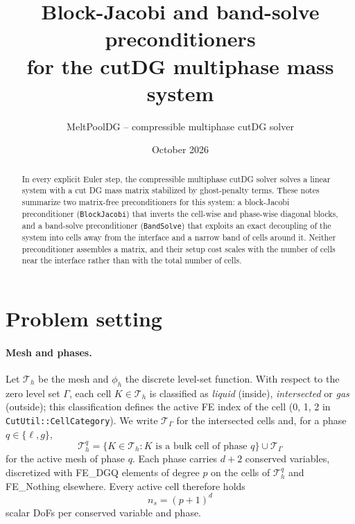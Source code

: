 \documentclass[11pt,a4paper]{article}
\title{Block-Jacobi and band-solve preconditioners\\
for the cutDG multiphase mass system}
\author{MeltPoolDG -- compressible multiphase cutDG solver}
\date{October 2026}
\newcommand{\Th}{\mathcal{T}_h}
\newcommand{\TG}{\mathcal{T}_\Gamma}
\newcommand{\code}[1]{\nolinkurl{#1}}
\newcommand{\param}[1]{\texttt{#1}}
\begin{document}
\maketitle

\begin{abstract}
  In every explicit Euler step, the compressible multiphase cutDG solver solves a linear system with
  a cut DG mass matrix stabilized by ghost-penalty terms. These notes summarize two matrix-free
  preconditioners for this system: a block-Jacobi preconditioner (\param{BlockJacobi}) that inverts
  the cell-wise and phase-wise diagonal blocks, and a band-solve preconditioner (\param{BandSolve})
  that exploits an exact decoupling of the system into cells away from the interface and a narrow
  band of cells around it. Neither preconditioner assembles a matrix, and their setup cost scales
  with the number of cells near the interface rather than with the total number of cells.
\end{abstract}

\tableofcontents

\section{Problem setting}
\label{sec:setting}

\paragraph{Mesh and phases.}
Let $\Th$ be the mesh and $\phi_h$ the discrete level-set function. With respect to the zero level
set $\Gamma$, each cell $K\in\Th$ is classified as \emph{liquid} (inside), \emph{intersected} or
\emph{gas} (outside); this classification defines the active FE index of the cell (0, 1, 2 in
\code{CutUtil::CellCategory}). We write $\TG$ for the intersected cells and, for a phase
$q\in\{\ell,g\}$,
\begin{equation*}
  \Th^q = \{K\in\Th : K \text{ is a bulk cell of phase } q\} \cup \TG
\end{equation*}
for the active mesh of phase $q$. Each phase carries $d+2$ conserved variables, discretized with
FE\_DGQ elements of degree $p$ on the cells of $\Th^q$ and FE\_Nothing elsewhere. Every active cell
therefore holds
\begin{equation*}
  n_s = (p+1)^d
\end{equation*}
scalar DoFs per conserved variable and phase.
\end{document}
